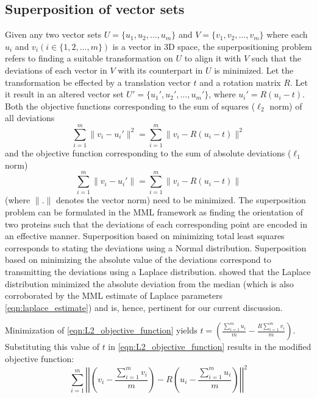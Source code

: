\documentclass[wcp]{jmlr}
\begin{document}
\subsection{Superposition of vector sets}
Given any two vector sets $U = \{u_1,u_2,\ldots,u_m\}$ and $V = \{v_1,v_2,\ldots,v_m\}$
where each $u_i$ and $v_i (i \in \{1,2,\ldots,m\})$ is a vector in 3D space, the 
superpositioning problem refers to finding a suitable transformation on $U$ to
align it with $V$ such that the deviations of each vector in $V$ with its counterpart
in $U$ is minimized. Let the transformation be effected by a translation vector $t$ and a rotation matrix $R$.
Let it result in an altered vector set $U'=\{u_1',u_2',\ldots,u_m'\}$, where $u_i'=R(u_i-t)$.
Both the objective functions corresponding to the sum of squares ($\ell_2$ norm) of all deviations
\begin{equation} 
  \sum_{i=1}^m \|v_i-u_i'\|^2 = \sum_{i=1}^m \|v_i-R(u_i-t)\|^2 \label{eqn:L2_objective_function}
\end{equation} 
and the objective function corresponding to the sum of absolute deviations ($\ell_1$ norm)
\begin{equation} 
  \sum_{i=1}^m \|v_i-u_i'\| = \sum_{i=1}^m \|v_i-R(u_i-t)\| \label{eqn:L1_objective_function}
\end{equation}
(where $\|.\|$ denotes the vector norm) need to be minimized. 
The superposition problem can be formulated in the MML framework as finding the 
orientation of two proteins such that the deviations of each corresponding point
are encoded in an effective manner. Superposition based on minimizing total least
squares corresponds to stating the deviations using a Normal distribution. 
Superposition based on minimizing the absolute value of the deviations correspond
to transmitting the deviations using a Laplace distribution. \citet{keynes-laplace} 
showed that the Laplace distribution minimized the absolute deviation from the median
(which is also corroborated by the MML estimate of Laplace parameters 
\eqref{eqn:laplace_estimate}) and is, hence, pertinent for our current discussion. 

Minimization of \eqref{eqn:L2_objective_function} yields $t = \left(\frac{\sum_{i=1}^m u_i}{m} - \frac{R\sum_{i=1}^m v_i}{m}\right)$.
Substituting this value of $t$ in \eqref{eqn:L2_objective_function} results in the modified objective function:
\begin{equation}
\sum_{i=1}^m \left|\left|\left(v_i - \frac{\sum_{i=1}^m v_i}{m}\right) - R \left(u_i - \frac{\sum_{i=1}^m u_i}{m}\right)\right|\right|^2 \label{eqn:L2_after_translation}
\end{equation} 
\end{document}
